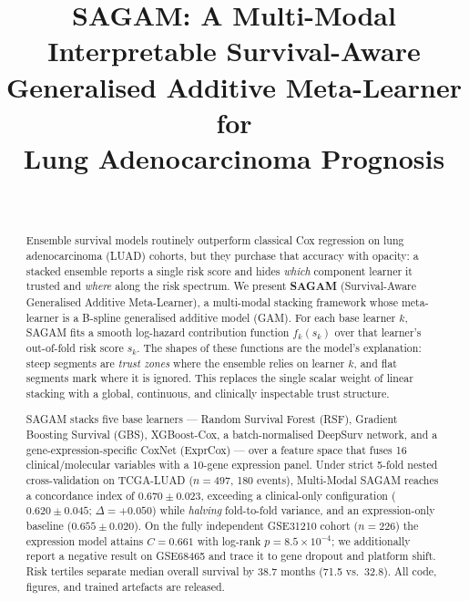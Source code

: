 \documentclass[journal]{IEEEtran}
\begin{document}
\title{SAGAM: A Multi-Modal Interpretable Survival-Aware\\
Generalised Additive Meta-Learner for\\
Lung Adenocarcinoma Prognosis}

\author{%
\\
%
}

\maketitle

\begin{abstract}
Ensemble survival models routinely outperform classical Cox regression on
lung adenocarcinoma (LUAD) cohorts, but they purchase that accuracy with
opacity: a stacked ensemble reports a single risk score and hides
\emph{which} component learner it trusted and \emph{where} along the risk
spectrum. We present \textbf{SAGAM} (Survival-Aware Generalised Additive
Meta-Learner), a multi-modal stacking framework whose meta-learner is a
B-spline generalised additive model (GAM). For each base learner $k$, SAGAM
fits a smooth log-hazard contribution function $f_k(s_k)$ over that learner's
out-of-fold risk score $s_k$. The shapes of these functions are the model's
explanation: steep segments are \emph{trust zones} where the ensemble relies
on learner $k$, and flat segments mark where it is ignored. This replaces the
single scalar weight of linear stacking with a global, continuous, and
clinically inspectable trust structure.

SAGAM stacks five base learners --- Random Survival Forest (RSF), Gradient
Boosting Survival (GBS), XGBoost-Cox, a batch-normalised DeepSurv network, and
a gene-expression-specific CoxNet (ExprCox) --- over a feature space that
fuses 16 clinical/molecular variables with a 10-gene expression panel. Under
strict 5-fold nested cross-validation on TCGA-LUAD ($n{=}497$, 180 events),
Multi-Modal SAGAM reaches a concordance index of
$\mathbf{0.670 \pm 0.023}$, exceeding a clinical-only configuration
($0.620 \pm 0.045$; $\Delta{=}{+}0.050$) while \emph{halving} fold-to-fold
variance, and an expression-only baseline ($0.655 \pm 0.020$). On the fully
independent GSE31210 cohort ($n{=}226$) the expression model attains
$C{=}0.661$ with log-rank $p{=}8.5{\times}10^{-4}$; we additionally report a
negative result on GSE68465 and trace it to gene dropout and platform shift.
Risk tertiles separate median overall survival by $38.7$ months
(71.5 vs.\ 32.8). All code, figures, and trained artefacts are released.
\end{abstract}
\end{document}
